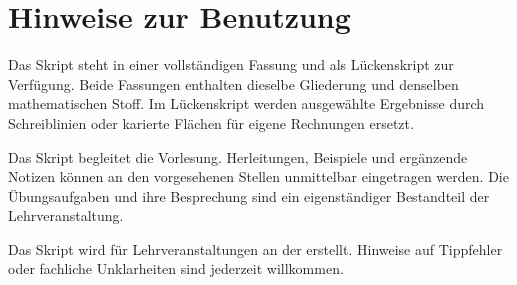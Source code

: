 \chapter*{Hinweise zur Benutzung}

Das Skript steht in einer vollständigen Fassung und als Lückenskript zur
Verfügung. Beide Fassungen enthalten dieselbe Gliederung und denselben
mathematischen Stoff. Im Lückenskript werden ausgewählte Ergebnisse durch
Schreiblinien oder karierte Flächen für eigene Rechnungen ersetzt.

Das Skript begleitet die Vorlesung. Herleitungen, Beispiele und ergänzende
Notizen können an den vorgesehenen Stellen unmittelbar eingetragen werden.
Die Übungsaufgaben und ihre Besprechung sind ein eigenständiger Bestandteil
der Lehrveranstaltung.

Das Skript wird für Lehrveranstaltungen an der \Institution erstellt. Hinweise auf
Tippfehler oder fachliche Unklarheiten sind jederzeit willkommen.
